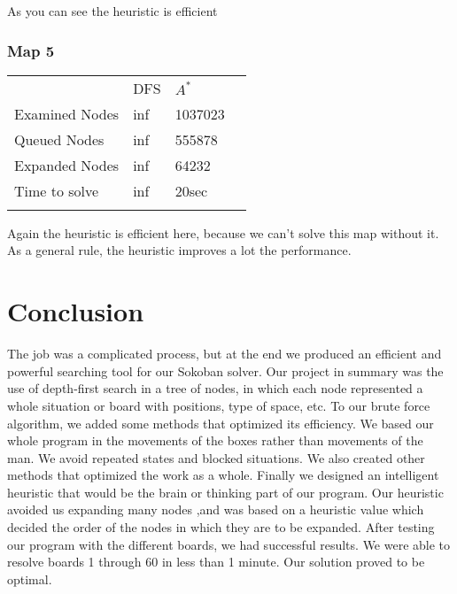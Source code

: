 \documentclass[journal]{IEEEtran}
\begin{document}
As you can see the heuristic is efficient
\subsubsection{Map 5}
\begin{tabular}{llll}
    & DFS & $A^*$ \\
   Examined Nodes & inf & 1037023 \\
   Queued Nodes & inf & 555878 \\
   Expanded Nodes & inf & 64232 \\
   Time to solve & inf & 20sec \\\\
\end{tabular}

Again the heuristic is efficient here, because we can't solve this map without it.\\

As a general rule, the heuristic improves a lot the performance.

\section{Conclusion}
The job was a complicated process, but at the end we produced an efficient and powerful searching tool for our Sokoban solver.  Our project in summary was the use of depth-first search in a tree of nodes, in which each node represented a whole situation or board with positions, type of space, etc. To our brute force algorithm, we added some methods that optimized its efficiency. We based our whole program in the movements of the boxes rather than movements of the man. We avoid repeated states and blocked situations. We also created other methods that optimized the work as a whole. Finally we designed an intelligent heuristic that would be the brain or thinking part of our program. Our heuristic avoided us expanding many nodes ,and was based on a heuristic value which decided the order of the nodes in which they are to be expanded. After testing our program with the different boards, we had successful results. We were able to resolve boards 1 through 60 in less than 1 minute. Our solution proved to be optimal.




\appendices


\end{document}
